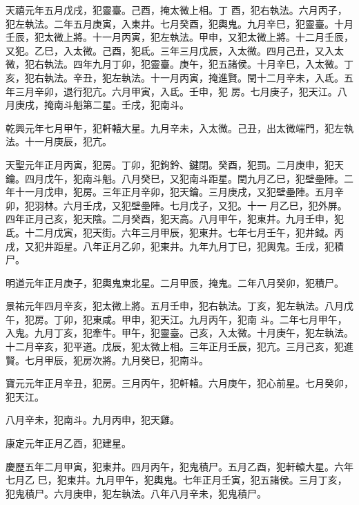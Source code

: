 \begin{pinyinscope}
 天禧元年五月戊戌，犯靈臺。己酉，掩太微上相。丁
 酉，犯右執法。六月丙子，犯左執法。二年五月庚寅，入東井。七月癸酉，犯輿鬼。九月辛巳，犯靈臺。十月壬辰，犯太微上將。十一月丙寅，犯左執法。甲申，又犯太微上將。十二月壬辰，又犯。乙巳，入太微。己酉，犯氐。三年三月戊辰，入太微。四月己丑，又入太微，犯右執法。四年九月丁卯，犯靈臺。庚午，犯五諸侯。十月辛巳，入太微。丁亥，犯右執法。辛丑，犯左執法。十一月丙寅，掩進賢。閏十二月辛未，入氐。五年三月辛卯，退行犯亢。六月甲寅，入氐。壬申，犯
 房。七月庚子，犯天江。八月庚戌，掩南斗魁第二星。壬戌，犯南斗。



 乾興元年七月甲午，犯軒轅大星。九月辛未，入太微。己丑，出太微端門，犯左執法。十一月庚辰，犯亢。



 天聖元年正月丙寅，犯房。丁卯，犯鉤鈐、鍵閉。癸酉，犯罰。二月庚申，犯天鑰。四月戊午，犯南斗魁。八月癸巳，又犯南斗距星。閏九月乙巳，犯壁壘陣。二年十一月戊申，犯房。三年正月辛卯，犯天鑰。三月庚戌，又犯壁壘陣。五月辛卯，犯羽林。六月壬戌，又犯壁壘陣。七月戊子，又犯。十一
 月乙巳，犯外屏。四年正月己亥，犯天陰。二月癸酉，犯天高。八月甲午，犯東井。九月壬申，犯氐。十二月戊寅，犯天街。六年三月甲辰，犯東井。七年七月壬午，犯井鉞。丙戌，又犯井距星。八年正月乙卯，犯東井。九年九月丁巳，犯輿鬼。壬戌，犯積尸。



 明道元年正月庚子，犯輿鬼東北星。二月甲辰，掩鬼。二年八月癸卯，犯積尸。



 景祐元年四月辛亥，犯太微上將。五月壬申，犯右執法。丁亥，犯左執法。八月戊午，犯房。丁卯，犯東咸。甲申，犯天江。九月丙午，犯南
 斗。二年七月甲午，入鬼。九月丁亥，犯牽牛。甲午，犯靈臺。己亥，入太微。十月庚午，犯左執法。十二月辛亥，犯平道。戊辰，犯太微上相。三年正月壬辰，犯亢。三月己亥，犯進賢。七月甲辰，犯房次將。九月癸巳，犯南斗。



 寶元元年正月辛丑，犯房。三月丙午，犯軒轅。六月庚午，犯心前星。七月癸卯，犯天江。



 八月辛未，犯南斗。九月丙申，犯天雞。



 康定元年正月乙酉，犯建星。



 慶歷五年二月甲寅，犯東井。四月丙午，犯鬼積尸。五月乙酉，犯軒轅大星。六年七月乙
 巳，犯東井。九月甲午，犯輿鬼。七年正月壬寅，犯五諸侯。三月丁亥，犯鬼積尸。六月庚申，犯左執法。八年八月辛未，犯鬼積尸。




\end{pinyinscope}
